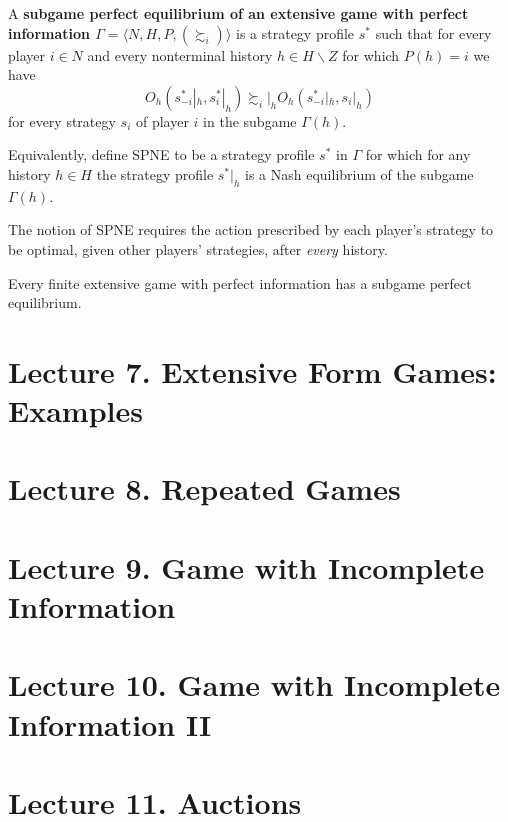 \documentclass[11pt]{article}
\begin{document}
			\begin{definition}[97.2]
				A \textbf{subgame perfect equilibrium of an extensive game with perfect information $\Gamma = \langle N, H, P, (\succsim_i) \rangle$} is a strategy profile $s^*$ such that for every player $i \in N$ and every nonterminal history $h \in H \backslash Z$ for which $P(h) = i$ we have
				\[
					O_h (s_{-i}^*|_h, s_{i}^*|_h) \succsim_i|_h O_h (s_{-i}^*|_h, s_{i}|_h)
				\]
				for every strategy $s_i$ of player $i$ in the subgame $\Gamma(h)$.
			\end{definition}
			
			\begin{definition}[pg.97]Equivalently, define SPNE to be a strategy profile $s^*$ in $\Gamma$ for which for any history $h \in H$ the strategy profile $s^*|_h$ is a Nash equilibrium of the subgame $\Gamma(h)$.
				
			\end{definition}
			
			\begin{remark}[pg. 97]
				The notion of SPNE requires the action prescribed by each player's strategy to be optimal, given other players' strategies, after \emph{every} history.
			\end{remark}
			
			\begin{proposition}[99.2]
				Every finite extensive game with perfect information has a subgame perfect equilibrium.
			\end{proposition}
	\section{Lecture 7. Extensive Form Games: Examples}
	\section{Lecture 8. Repeated Games}
	\section{Lecture 9. Game with Incomplete Information}
	\section{Lecture 10. Game with Incomplete Information II}
	\section{Lecture 11. Auctions}
\end{document}
